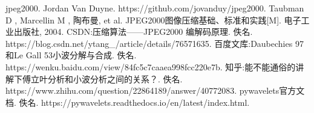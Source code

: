 \begin{thebibliography}{1}
 jpeg2000. Jordan Van Duyne. https://github.com/jovanduy/jpeg2000.
 Taubman D , Marcellin M , 陶布曼, et al. JPEG2000图像压缩基础、标准和实践[M]. 电子工业出版社, 2004.
 CSDN:压缩算法——JPEG2000 编解码原理. 佚名. https://blog.csdn.net/ytang\_/article/details/76571635.
 百度文库:Daubechies 97和Le Gall 53小波分解与合成. 佚名. https://wenku.baidu.com/view/84fc5c7caaea998fcc220e7b.
 知乎:能不能通俗的讲解下傅立叶分析和小波分析之间的关系？. 佚名. https://www.zhihu.com/question/22864189/answer/40772083.
 pywavelets官方文档. 佚名. https://pywavelets.readthedocs.io/en/latest/index.html.
\end{thebibliography}